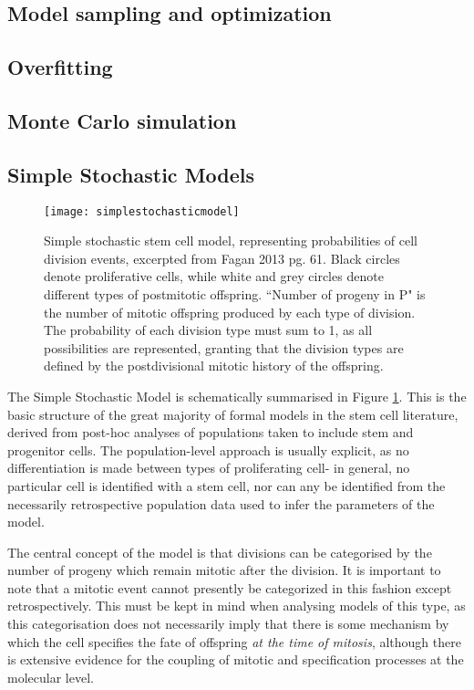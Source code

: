 \subsection{Model sampling and optimization}


\subsection{Overfitting}
\label{overfit}

\subsection{Monte Carlo simulation}
\label{MonteCarlo}


 
\subsection{Simple Stochastic Models}
\label{SSM}

\begin{figure}
\texttt{[image: simplestochasticmodel]}
\centering
\caption{Simple stochastic stem cell model, representing probabilities of cell division events, excerpted from Fagan 2013 pg. 61. Black circles denote proliferative cells, while white and grey circles denote different types of postmitotic offspring. ``Number of progeny in P" is the number of mitotic offspring produced by each type of division. The probability of each division type must sum to 1, as all possibilities are represented, granting that the division types are defined by the postdivisional mitotic history of the offspring.}
\label{fig:SSM}
\end{figure}

The Simple Stochastic Model is schematically summarised in Figure \ref{fig:SSM}. This is the basic structure of the great majority of formal models in the stem cell literature, derived from post-hoc analyses of populations taken to include stem and progenitor cells. The population-level approach is usually explicit, as no differentiation is made between types of proliferating cell- in general, no particular cell is identified with a stem cell, nor can any be identified from the necessarily retrospective population data used to infer the parameters of the model. 

The central concept of the model is that divisions can be categorised by the number of progeny which remain mitotic after the division. It is important to note that a mitotic event cannot presently be categorized in this fashion except retrospectively. This must be kept in mind when analysing models of this type, as this categorisation does not necessarily imply that there is some mechanism by which the cell specifies the fate of offspring \textit{at the time of mitosis}, although there is extensive evidence for the coupling of mitotic and specification processes at the molecular level.

